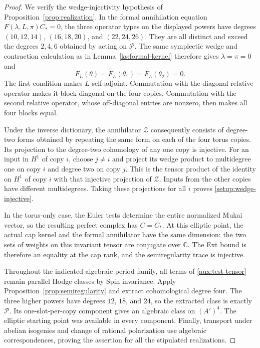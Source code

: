 \documentclass[11pt]{article}
\numberwithin{equation}{section}
\theoremstyle{definition}
\theoremstyle{remark}
\newcommand{\C}{\mathbb C}
\begin{document}
\begin{proof}
We verify the wedge-injectivity hypothesis of
Proposition~\ref{prop:realization}.  In the formal
annihilation equation $F(\lambda,L,\pi)C_*=0$, the
three operator types on the displayed powers have
degrees $(10,12,14)$, $(16,18,20)$, and $(22,24,26)$.
They are all distinct and exceed the degrees $2,4,6$
obtained by acting on $\mathcal P$.  The same symplectic
wedge and contraction calculation as in
Lemma~\ref{ks:formal-kernel} therefore gives
$\lambda=\pi=0$ and
\[
 F_L(\theta)=F_L(\theta_1)=F_L(\theta_2)=0.
\]
The first condition makes $L$ self-adjoint.  Commutation
with the diagonal relative operator makes it block
diagonal on the four copies.  Commutation with the
second relative operator, whose off-diagonal entries
are nonzero, then makes all four blocks equal.

Under the inverse dictionary, the annihilator
$\mathcal Z$ consequently consists of degree-two forms
obtained by repeating the same form on each of the
four torus copies.  Its projection to the degree-two
cohomology of any one copy is injective.  For an input
in $H^1$ of copy $i$, choose $j\ne i$ and project its
wedge product to multidegree one on copy $i$ and
degree two on copy $j$.  This is the tensor product
of the identity on $H^1$ of copy $i$ with that
injective projection of $\mathcal Z$.  Inputs from
the other copies have different multidegrees.  Taking
these projections for all $i$ proves
\eqref{setup:wedge-injective}.

In the torus-only case, the Euler tests determine
the entire normalized Mukai vector, so the resulting
perfect complex has $C=C_*$.  At this elliptic point,
the actual cap kernel and the formal annihilator
have the same dimension: the two sets of weights
on this invariant tensor are conjugate over $\C$.
The Ext bound is therefore an equality at the cap
rank, and the semiregularity trace is injective.

Throughout the indicated algebraic period family,
all terms of \eqref{aux:test-tensor} remain parallel
Hodge classes by Spin invariance.  Apply
Proposition~\ref{prop:semiregularity} and extract
cohomological degree four.  The three higher powers
have degrees $12$, $18$, and $24$, so the extracted
class is exactly $\mathcal P$.  Its one-slot-per-copy
component gives an algebraic class on $(A')^4$.
The elliptic starting point was available in every
component.  Finally, transport under abelian
isogenies and change of rational polarization use
algebraic correspondences, proving the assertion
for all the stipulated realizations.
\end{proof}
\end{document}

